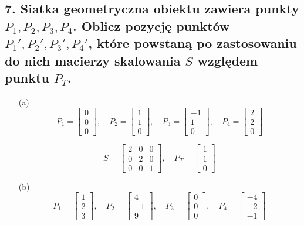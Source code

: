 \subsection*{7. Siatka geometryczna obiektu zawiera punkty \( P_1, P_2, P_3, P_4 \). Oblicz pozycję punktów \( P_1', P_2', P_3', P_4' \), które powstaną po zastosowaniu do nich macierzy skalowania \( S \) względem punktu \( P_T \).}

\begin{enumerate}
    \item[(a)] 
    \[
    P_1 = \begin{bmatrix} 0 \\ 0 \\ 0 \end{bmatrix}, 
    \quad P_2 = \begin{bmatrix} 1 \\ 1 \\ 0 \end{bmatrix}, 
    \quad P_3 = \begin{bmatrix} -1 \\ 1 \\ 0 \end{bmatrix}, 
    \quad P_4 = \begin{bmatrix} 2 \\ 2 \\ 0 \end{bmatrix}
    \]
    
    \[
    S = \begin{bmatrix} 2 & 0 & 0 \\ 0 & 2 & 0 \\ 0 & 0 & 1 \end{bmatrix}, 
    \quad P_T = \begin{bmatrix} 1 \\ 1 \\ 0 \end{bmatrix}
    \]

    \item[(b)] 
    \[
    P_1 = \begin{bmatrix} 1 \\ 2 \\ 3 \end{bmatrix}, 
    \quad P_2 = \begin{bmatrix} 4 \\ -1 \\ 9 \end{bmatrix}, 
    \quad P_3 = \begin{bmatrix} 0 \\ 0 \\ 0 \end{bmatrix}, 
    \quad P_4 = \begin{bmatrix} -4 \\ -2 \\ -1 \end{bmatrix}
    \]
    

\end{enumerate}
